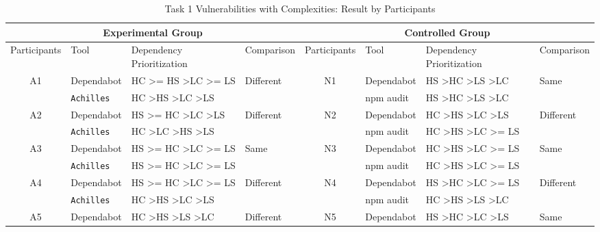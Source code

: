 \documentclass[conference]{IEEEtran}
\begin{document}
	\begin{table}
		\caption{Task 1 Vulnerabilities with Complexities: Result by Participants}
		\centering
		\begin{tabular}{clll|clll}
			\toprule
			\multicolumn{4}{c|}{Experimental Group} & \multicolumn{4}{c}{Controlled Group}  \\ 
			\midrule
			Participants         & Tool       & Dependency Prioritization & Comparison & Participants & Tool  & Dependency Prioritization & Comparison \\ 
			\midrule
			\multirow{2}{*}{A1}   & Dependabot    & HC \textgreater{}= HS \textgreater LC \textgreater{}= LS & \multirow{2}{*}{Different} & \multirow{2}{*}{N1} & Dependabot & HS \textgreater HC \textgreater LS \textgreater LC & \multirow{2}{*}{Same} \\ 
			& \texttt{Achilles}      & HC \textgreater HS \textgreater LC \textgreater LS       & & & npm audit & HS \textgreater HC \textgreater LS \textgreater LC & \\ \midrule
			\multirow{2}{*}{A2}   & Dependabot    & HS \textgreater{}= HC \textgreater LC \textgreater LS    & \multirow{2}{*}{Different} & \multirow{2}{*}{N2} & Dependabot & HC \textgreater HS \textgreater LC \textgreater LS & \multirow{2}{*}{Different} \\ 
			& \texttt{Achilles}      & HC \textgreater LC \textgreater HS \textgreater LS       & & & npm audit & HC \textgreater HS \textgreater LC \textgreater{}= LS & \\ \midrule
			\multirow{2}{*}{A3}   & Dependabot    & HS \textgreater{}= HC \textgreater LC \textgreater{}= LS & \multirow{2}{*}{Same} & \multirow{2}{*}{N3} & Dependabot & HC \textgreater HS \textgreater LC \textgreater{}= LS & \multirow{2}{*}{Same} \\ 
			& \texttt{Achilles}      & HS \textgreater{}= HC \textgreater LC \textgreater{}= LS & & & npm audit & HC \textgreater HS \textgreater LC \textgreater{}= LS & \\ \midrule
			\multirow{2}{*}{A4}   & Dependabot    & HS \textgreater{}= HC \textgreater LC \textgreater{}= LS & \multirow{2}{*}{Different} & \multirow{2}{*}{N4} & Dependabot & HS \textgreater HC \textgreater LC \textgreater{}= LS  & \multirow{2}{*}{Different} \\ 
			& \texttt{Achilles}      & HC \textgreater HS \textgreater LC \textgreater LS       & & & npm audit & HC \textgreater HS \textgreater LS \textgreater LC & \\ \midrule
			\multirow{2}{*}{A5}   & Dependabot    & HC \textgreater HS \textgreater LS \textgreater LC       & \multirow{2}{*}{Different} & \multirow{2}{*}{N5} & Dependabot & HS \textgreater HC \textgreater LC \textgreater LS & \multirow{2}{*}{Same} \\ 

\end{tabular}
\end{table}
\end{document}
